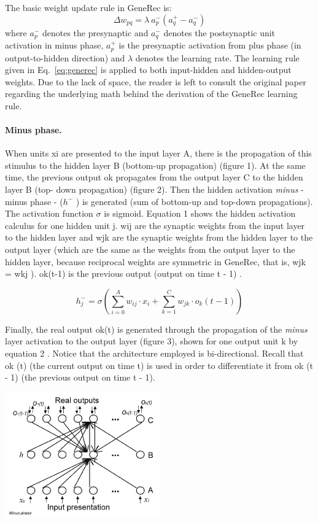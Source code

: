 The basic weight update rule in GeneRec is:
\begin{equation}
  \Delta w_{pq} = \lambda \ a^{-}_p(a^{+}_q - a^{-}_q)
\label{eq:generec}
\end{equation}
where $a^{-}_p$ denotes the presynaptic and $a^{-}_q$ denotes the postsynaptic unit activation in minus phase, $a^{+}_p$ is the presynaptic activation from plus phase (in output-to-hidden direction) and $\lambda$ denotes the learning rate. The learning rule given in Eq.~\ref{eq:generec} is applied to both input-hidden and hidden-output weights.  Due to the lack of space, the reader is left to consult the original paper \citet{o1996bio} regarding the underlying math behind the derivation of the GeneRec learning rule.

\paragraph{Minus phase.} When units xi are presented to the input layer A, there is the propagation of this stimulus to the hidden layer B (bottom-up propagation) (figure 1). At the same time, the previous output ok propagates from the output layer C to the hidden layer B (top- down propagation) (figure 2). Then the hidden activation \emph{minus} - minus phase - ($h^-$ ) is generated (sum of bottom-up and top-down propagations). The activation function $\sigma$ is sigmoid. Equation 1 shows the hidden activation calculus for one hidden unit j. wij are the synaptic weights from the input layer to the hidden layer and wjk are the synaptic weights from the hidden layer to the output layer (which are the same as the weights from the output layer to the hidden layer, because reciprocal weights are symmetric in GeneRec, that is, wjk = wkj \citet{o1996bio}). ok(t-1) is the previous output (output on time t - 1) \citet{orru2008sabio}.

$$h_j^- = \sigma \left(\sum_{i=0}^A w_{ij} \cdot x_i + \sum_{k=1}^C w_{jk} \cdot o_k(t-1)\right)$$

Finally, the real output ok(t) is generated through the propagation of the \emph{minus} layer activation to the output layer (figure 3), shown for one output unit k by equation 2 \citet{o1996bio}. Notice that the architecture employed is bi-directional. Recall that ok (t) (the current output on time t) is used in order to differentiate it from ok (t - 1) (the previous output on time t - 1).

\begin{center} 
\includegraphics[width=0.5\textwidth]{img/generec_minus_phase.png} \citet{orru2008sabio} 
\end{center} 


